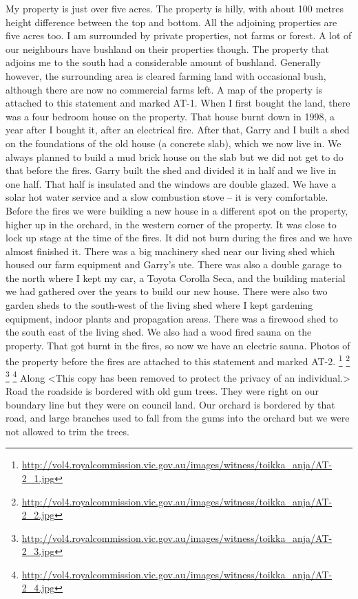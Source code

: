 \documentclass[a4paper]{article}
\begin{document}
        My property is just over five acres. The property is hilly, with about 100 metres height difference between the top and bottom. All the adjoining properties are five acres too. I am surrounded by private properties, not farms or forest. A lot of our neighbours have bushland on their properties though. The property that adjoins me to the south had a considerable amount of bushland. Generally however, the surrounding area is cleared farming land with occasional bush, although there are now no commercial farms left. A map of the property is attached to this statement and marked AT-1.
        When I first bought the land, there was a four bedroom house on the property. That house burnt down in 1998, a year after I bought it, after an electrical fire.
        After that, Garry and I built a shed on the foundations of the old house (a concrete slab), which we now live in. We always planned to build a mud brick house on the slab but we did not get to do that before the fires. Garry built the shed and divided it in half and we live in one half. That half is insulated and the windows are double glazed. We have a solar hot water service and a slow combustion stove – it is very comfortable.
        Before the fires we were building a new house in a different spot on the property, higher up in the orchard, in the western corner of the property. It was close to lock up stage at the time of the fires. It did not burn during the fires and we have almost finished it.
        There was a big machinery shed near our living shed which housed our farm equipment and Garry's ute. There was also a double garage to the north where I kept my car, a Toyota Corolla Seca, and the building material we had gathered over the years to build our new house. There were also two garden sheds to the south-west of the living shed where I kept gardening equipment, indoor plants and propagation areas. There was a firewood shed to the south east of the living shed. We also had a wood fired sauna on the property. That got burnt in the fires, so now we have an electric sauna. Photos of the property before the fires are attached to this statement and marked AT-2.
        \footnote{\url{http://vol4.royalcommission.vic.gov.au/images/witness/toikka_anja/AT-2_1.jpg}}
        \footnote{\url{http://vol4.royalcommission.vic.gov.au/images/witness/toikka_anja/AT-2_2.jpg}}
        \footnote{\url{http://vol4.royalcommission.vic.gov.au/images/witness/toikka_anja/AT-2_3.jpg}}
        \footnote{\url{http://vol4.royalcommission.vic.gov.au/images/witness/toikka_anja/AT-2_4.jpg}}
        Along <This copy has been removed to protect the privacy of an individual.> Road the roadside is bordered with old gum trees. They were right on our boundary line but they were on council land. Our orchard is bordered by that road, and large branches used to fall from the gums into the orchard but we were not allowed to trim the trees.
\end{document}
